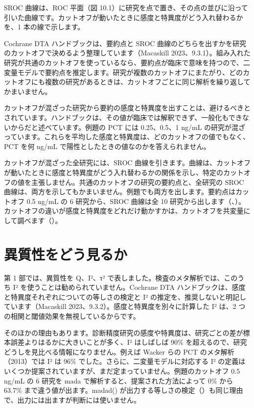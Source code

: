 SROC 曲線は、ROC 平面（図 10.1）に研究を点で置き、その点の並びに沿って引いた曲線です。カットオフが動いたときに感度と特異度がどう入れ替わるかを、1 本の線で示します。

Cochrane DTA ハンドブックは、要約点と SROC 曲線のどちらを出すかを研究のカットオフで決めるよう整理しています（Macaskill 2023、9.3.1）。組み入れた研究が共通のカットオフを使っているなら、要約点が臨床で意味を持つので、二変量モデルで要約点を推定します。研究が複数のカットオフにまたがり、どのカットオフにも複数の研究があるときは、カットオフごとに同じ解析を繰り返してかまいません。

カットオフが混ざった研究から要約の感度と特異度を出すことは、避けるべきとされています。ハンドブックは、その値が臨床では解釈できず、一般化もできないからだと述べています。例題の PCT には 0.25、0.5、1 ng/mL の研究が混ざっています。これらを平均した感度と特異度は、どのカットオフの値でもなく、PCT を何 ng/mL で陽性としたときの値なのかを答えられません。

カットオフが混ざった全研究には、SROC 曲線を引きます。曲線は、カットオフが動いたときに感度と特異度がどう入れ替わるかの関係を示し、特定のカットオフの値を主張しません。共通のカットオフの研究の要約点と、全研究の SROC 曲線は、両方を示してもかまいません。例題でも両方を出します。要約点はカットオフ 0.5 ng/mL の 6 研究から、SROC 曲線は全 10 研究から出します（、）。カットオフの違いが感度と特異度をどれだけ動かすかは、カットオフを共変量にして調べます（）。

\section{異質性をどう見るか}
\label{sec:10-7}

第 1 部では、異質性を Q、I²、τ² で表しました。検査のメタ解析では、このうち I² を使うことは勧められていません。Cochrane DTA ハンドブックは、感度と特異度それぞれについての等しさの検定と I² の推定を、推奨しないと明記しています（Macaskill 2023、9.3.2）。感度と特異度を別々に計算した I² は、2 つの相関と閾値効果を無視しているからです。

\begin{hattenbox}
そのほかの理由もあります。診断精度研究の感度や特異度は、研究ごとの差が標本誤差よりはるかに大きいことが多く、I² はしばしば 90\% を超えるので、研究どうしを見比べる情報になりません。例えば Wacker らの PCT のメタ解析（2013）では I² は 96\% でした。さらに、二変量モデルに対応する I² の定義はいくつか提案されていますが、まだ定まっていません。例題のカットオフ 0.5 ng/mL の 6 研究を mada で解析すると、提案された方法によって 0\% から 63.7\% まで違う値が出ます。madad() が出力する等しさの検定（）も同じ理由で、出力には出ますが判断には使いません。
\end{hattenbox}

